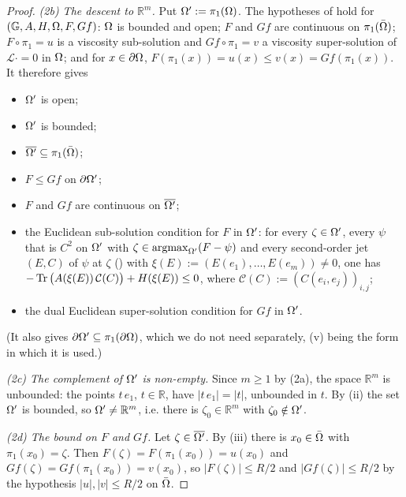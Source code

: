 \begin{proof}
\emph{(2b) The descent to $\mathbb R^{m}$.} Put $\Omega':=\pi_1(\Omega)$. The hypotheses of
 hold for $(\mathbb G,A,H,\Omega,F,Gf)$: $\Omega$ is bounded and
open; $F$ and $Gf$ are continuous on $\pi_1(\bar{\Omega})$; $F\circ\pi_1=u$ is a viscosity
sub-solution and $Gf\circ\pi_1=v$ a viscosity super-solution of $\mathcal L\cdot=0$ in $\Omega$;
and for $x\in\partial\Omega$, $F(\pi_1(x))=u(x)\le v(x)=Gf(\pi_1(x))$. It therefore gives
\begin{itemize}
\item[(i)] $\Omega'$ is open;
\item[(ii)] $\Omega'$ is bounded;
\item[(iii)] $\overline{\Omega'}\subseteq\pi_1(\bar{\Omega})$;
\item[(v)] $F\le Gf$ on $\partial\Omega'$;
\item[(vi)] $F$ and $Gf$ are continuous on $\overline{\Omega'}$;
\item[(vii)] the Euclidean sub-solution condition for $F$ in $\Omega'$: for every $\zeta\in\Omega'$,
  every $\psi$ that is $C^{2}$ on $\Omega'$ with $\zeta\in\operatorname*{argmax}_{\Omega'}(F-\psi)$ and every
  second-order jet $(E,C)$ of $\psi$ at $\zeta$ () with
  $\xi(E):=(E(e_1),\ldots,E(e_m))\ne0$, one has
  $-\operatorname{Tr}\big(A(\xi(E))\,\mathcal C(C)\big)+H(\xi(E))\le0$, where
  $\mathcal C(C):=(C(e_i,e_j))_{i,j}$;
\item[(viii)] the dual Euclidean super-solution condition for $Gf$ in $\Omega'$.
\end{itemize}
(It also gives $\partial\Omega'\subseteq\pi_1(\partial\Omega)$, which we do not need separately, (v) being
the form in which it is used.)

\emph{(2c) The complement of $\Omega'$ is non-empty.} Since $m\ge1$ by (2a), the space
$\mathbb R^{m}$ is unbounded: the points $t\,e_1$, $t\in\mathbb R$, have $|t\,e_1|=|t|$,
unbounded in $t$. By (ii) the set $\Omega'$ is bounded, so $\Omega'\ne\mathbb R^{m}$, i.e. there is
$\zeta_0\in\mathbb R^{m}$ with $\zeta_0\notin\Omega'$.

\emph{(2d) The bound on $F$ and $Gf$.} Let $\zeta\in\overline{\Omega'}$. By (iii) there is
$x_0\in\bar{\Omega}$ with $\pi_1(x_0)=\zeta$. Then $F(\zeta)=F(\pi_1(x_0))=u(x_0)$ and
$Gf(\zeta)=Gf(\pi_1(x_0))=v(x_0)$, so $|F(\zeta)|\le R/2$ and $|Gf(\zeta)|\le R/2$ by the
hypothesis $|u|,|v|\le R/2$ on $\bar{\Omega}$.


\end{proof}
